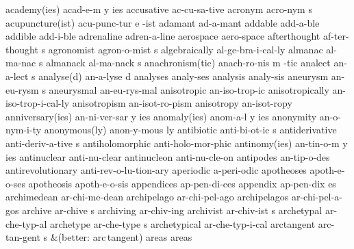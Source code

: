 \begingroup
\eightpoint
\3 academy(ies)		acad-e-m y ies
\1 accusative		ac-cu-sa-tive		%
\5 acronym		acro-nym s		%
\3 acupuncture(ist)	acu-punc-tur e -ist	%
\NewWordtrue
\1 adamant		ad-a-mant		%
\1 addable		add-a-ble
\1 addible		add-i-ble
\1 adrenaline		adren-a-line
\1 aerospace		aero-space
\5 afterthought 	af-ter-thought s
\5 agronomist		agron-o-mist s
\1 algebraically	al-ge-bra-i-cal-ly	%
\NewWordtrue
\5 almanac		al-ma-nac s		%
\NewWordtrue
\5 almanack		al-ma-nack s		%
\3 anachronism(tic)	anach-ro-nis m -tic	%
\NewWordtrue
\5 analect	 	an-a-lect s		%
\2 analyse(d)		an-a-lyse d
\1 analyses		analy-ses\thinspace*
\1 analysis		analy-sis		%
\5 aneurysm		an-eu-rysm s		%
\1 aneurysmal		an-eu-rys-mal		%
\1 anisotropic		an-iso-trop-ic		%
\1 anisotropically	an-iso-trop-i-cal-ly	%
\1 anisotropism		an-isot-ro-pism 	%
\1 anisotropy		an-isot-ropy		%
\3 anniversary(ies)	an-ni-ver-sar y ies	%
\3 anomaly(ies)		anom-a-l y ies
\NewWordtrue
\1 anonymity		an-o-nym-i-ty		%
\NewWordtrue
\2 anonymous(ly)	anon-y-mous ly		%
\NewWordtrue
\5 antibiotic		anti-bi-ot-ic s		%
\5 antiderivative	anti-deriv-a-tive s
\1 antiholomorphic	anti-holo-mor-phic	%
\3 antinomy(ies)	an-tin-o-m y ies
\1 antinuclear		anti-nu-clear
\1 antinucleon		anti-nu-cle-on
\NewWordtrue
\1 antipodes		an-tip-o-des		%
\1 antirevolutionary	anti-rev-o-lu-tion-ary
\1 aperiodic		a-peri-odic		%
\1 apotheoses		apoth-e-o-ses
\1 apotheosis		apoth-e-o-sis
\1 appendices		ap-pen-di-ces		%
\5 appendix		ap-pen-dix es		%
\1 archimedean		ar-chi-me-dean		%
\1 archipelago		ar-chi-pel-ago       %
\1 archipelagos		ar-chi-pel-a-gos
\5 archive		ar-chive s              %
\1 archiving		ar-chiv-ing             %
\5 archivist		ar-chiv-ist s           %
\1 archetypal		ar-che-typ-al
\5 archetype		ar-che-type s		%
\1 archetypical		ar-che-typ-i-cal
\5 arctangent		arc-tan-gent s
\tabalign		&\null\quad (better: arc\,tangent)\cr
\NewWordtrue
\1 areas		areas\thinspace*	%
